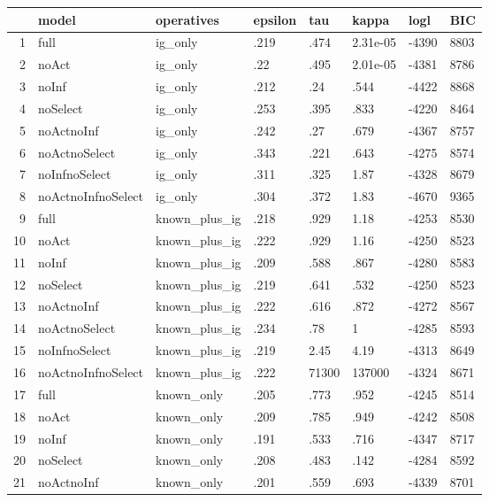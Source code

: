 \begin{table}[ht]
\centering
\begin{tabular}{rlllllll}
  \hline
 & model & operatives & epsilon & tau & kappa & logl & BIC \\ 
  \hline
1 & full & ig\_only & .219 & .474 & 2.31e-05 & -4390 & 8803 \\ 
  2 & noAct & ig\_only & .22 & .495 & 2.01e-05 & -4381 & 8786 \\ 
  3 & noInf & ig\_only & .212 & .24 & .544 & -4422 & 8868 \\ 
  4 & noSelect & ig\_only & .253 & .395 & .833 & -4220 & 8464 \\ 
  5 & noActnoInf & ig\_only & .242 & .27 & .679 & -4367 & 8757 \\ 
  6 & noActnoSelect & ig\_only & .343 & .221 & .643 & -4275 & 8574 \\ 
  7 & noInfnoSelect & ig\_only & .311 & .325 & 1.87 & -4328 & 8679 \\ 
  8 & noActnoInfnoSelect & ig\_only & .304 & .372 & 1.83 & -4670 & 9365 \\ 
  9 & full & known\_plus\_ig & .218 & .929 & 1.18 & -4253 & 8530 \\ 
  10 & noAct & known\_plus\_ig & .222 & .929 & 1.16 & -4250 & 8523 \\ 
  11 & noInf & known\_plus\_ig & .209 & .588 & .867 & -4280 & 8583 \\ 
  12 & noSelect & known\_plus\_ig & .219 & .641 & .532 & -4250 & 8523 \\ 
  13 & noActnoInf & known\_plus\_ig & .222 & .616 & .872 & -4272 & 8567 \\ 
  14 & noActnoSelect & known\_plus\_ig & .234 & .78 & 1 & -4285 & 8593 \\ 
  15 & noInfnoSelect & known\_plus\_ig & .219 & 2.45 & 4.19 & -4313 & 8649 \\ 
  16 & noActnoInfnoSelect & known\_plus\_ig & .222 & 71300 & 137000 & -4324 & 8671 \\ 
  17 & full & known\_only & .205 & .773 & .952 & -4245 & 8514 \\ 
  18 & noAct & known\_only & .209 & .785 & .949 & -4242 & 8508 \\ 
  19 & noInf & known\_only & .191 & .533 & .716 & -4347 & 8717 \\ 
  20 & noSelect & known\_only & .208 & .483 & .142 & -4284 & 8592 \\ 
  21 & noActnoInf & known\_only & .201 & .559 & .693 & -4339 & 8701 \\ 

\end{tabular}
\end{table}
